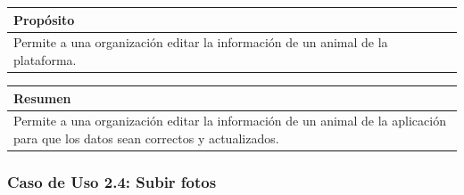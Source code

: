 \begin{table}[H]
    \centering
    \begin{tabularx}{\textwidth}{@{} |L |@{}} \hline
        \textbf{Propósito} \\
        \hline
        Permite a una organización editar la información de un animal de la plataforma. \\
        \hline
    \end{tabularx}
\end{table}

\begin{table}[H]
    \centering
    \begin{tabularx}{\textwidth}{@{} |L |@{}} \hline
        \textbf{Resumen} \\
        \hline
        Permite a una organización editar la información de un animal de la aplicación para que los datos
    sean correctos y actualizados. \\
        \hline
    \end{tabularx}
\end{table}

\subsubsection{Caso de Uso 2.4: Subir fotos}\label{subsubsec:subir-fotos-animal}

